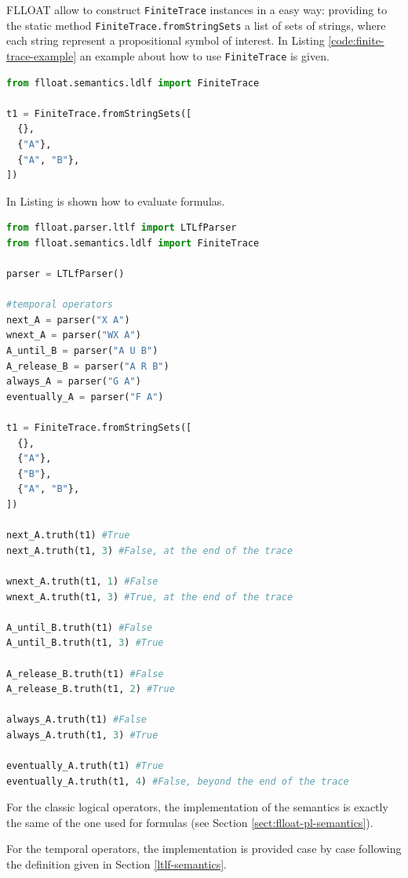 FLLOAT allow to construct \texttt{FiniteTrace} instances in a easy way: providing to the static method \texttt{FiniteTrace.fromStringSets} a list of sets of strings, where each string represent a propositional symbol of interest. In Listing \ref{code:finite-trace-example} an example about how to use \texttt{FiniteTrace} is given.
\begin{lstlisting}[language=Python, style=Python,  escapechar = £, label={code:finite-trace-example}, caption={Defining a finite trace $\trace = \tup{\set{}, \set{A}, \set{A, B}}$ in FLLOAT.}]
from flloat.semantics.ldlf import FiniteTrace

t1 = FiniteTrace.fromStringSets([
  {},
  {"A"},
  {"A", "B"},
])
\end{lstlisting}

In Listing is shown how to evaluate \LTLf formulas.
\begin{lstlisting}[language=Python, style=Python,  escapechar = £, label={code:ltlf-semantics-examples}, caption={Some examples about how evaluate \LTLf formulas.}]
from flloat.parser.ltlf import LTLfParser
from flloat.semantics.ldlf import FiniteTrace

parser = LTLfParser() 

#temporal operators
next_A = parser("X A")
wnext_A = parser("WX A")
A_until_B = parser("A U B")
A_release_B = parser("A R B")
always_A = parser("G A")
eventually_A = parser("F A")

t1 = FiniteTrace.fromStringSets([
  {},
  {"A"},
  {"B"},
  {"A", "B"},
])

next_A.truth(t1) #True
next_A.truth(t1, 3) #False, at the end of the trace

wnext_A.truth(t1, 1) #False
wnext_A.truth(t1, 3) #True, at the end of the trace

A_until_B.truth(t1) #False
A_until_B.truth(t1, 3) #True

A_release_B.truth(t1) #False
A_release_B.truth(t1, 2) #True

always_A.truth(t1) #False
always_A.truth(t1, 3) #True

eventually_A.truth(t1) #True
eventually_A.truth(t1, 4) #False, beyond the end of the trace
\end{lstlisting}

For the \LTLf classic logical operators, the implementation of the semantics is exactly the same of the one used for \PL formulas (see Section \ref{sect:flloat-pl-semantics}).

For the \LTLf temporal operators, the implementation is provided case by case following the definition given in Section \ref{ltlf-semantics}.

